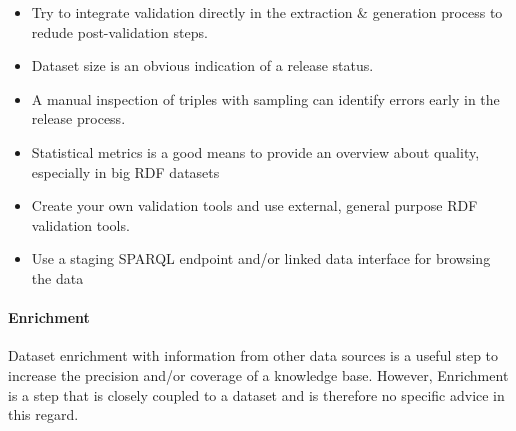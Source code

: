 \documentclass[a4paper,english,twoside,BCOR1.5cm,headsepline,DIV12,appendixprefix,final,12pt]{scrbook}
\def\emph{\textit}
\begin{document}
\begin{itemize}
\itemsep0em 
\item Try to integrate validation directly in the extraction \& generation process to redude post-validation steps.
\item Dataset size is an obvious indication of a release status. %
\item A manual inspection of triples with sampling can identify errors early in the release process. %
\item Statistical metrics is a good means to provide an overview about quality, especially in big RDF datasets%
\item Create your own validation tools and use external, general purpose RDF validation tools.
\item Use a staging SPARQL endpoint and/or linked data interface for browsing the data
\end{itemize}

\vspace{-1.5em}
\paragraph{Enrichment}
Dataset enrichment with information from other data sources is a useful step to increase the precision and/or coverage of a knowledge base.
However, Enrichment is a step that is closely coupled to a dataset and is therefore no specific advice in this regard.
\end{document}
